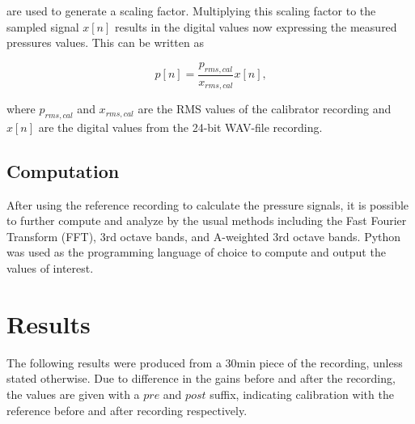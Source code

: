 \documentclass[twocolumn]{article}
\begin{document}
are used to generate a scaling factor.
Multiplying this scaling factor to the sampled signal $x[n]$ results in the digital
values now expressing the measured pressures values.
This can be written as

\begin{equation}
    p\left[n\right] = \frac{p_{rms,cal}}{x_{rms,cal}}x\left[n\right]\textrm{,}
\end{equation}

where $p_{rms,cal}$ and $x_{rms,cal}$ are the RMS values of the calibrator recording
and $x\left[n\right]$ are the digital values from the 24-bit WAV-file recording.

\subsection{Computation}
After using the reference recording to calculate the pressure signals, it is possible
to further compute and analyze by the usual methods including the Fast Fourier Transform
(FFT), 3rd octave bands, and A-weighted 3rd octave bands.
Python was used as the programming language of choice to compute and output the values
of interest.

\section{Results}
The following results were produced from a $30\textrm{min}$ piece of the recording, unless stated otherwise.
Due to difference in the gains before and after the recording, the values are given with a $pre$ and $post$ suffix,
indicating calibration with the reference before and after recording respectively.
\end{document}
